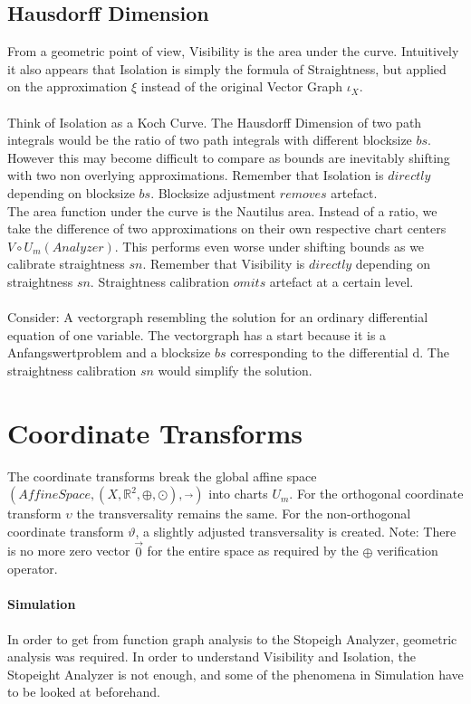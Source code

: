 \documentclass{report}
\begin{document}
\section{Hausdorff Dimension}

From a geometric point of view, Visibility is the area under the curve. Intuitively it also appears that Isolation is simply the formula of Straightness, but applied on the approximation $\xi$ instead of the original Vector Graph $\iota_{X}$.\\\\
Think of Isolation as a Koch Curve. The Hausdorff Dimension of two path integrals would be the ratio of two path integrals with different blocksize $bs$. However this may become difficult to compare as bounds are inevitably shifting with two non overlying approximations. Remember that Isolation is $directly$ depending on blocksize $bs$. Blocksize adjustment $removes$ artefact.\\
The area function under the curve is the Nautilus area. Instead of a ratio, we take the difference of two approximations on their own respective chart centers $V\circ U_{m}(Analyzer)$. This performs even worse under shifting bounds as we calibrate straightness $sn$. Remember that Visibility is $directly$ depending on straightness $sn$. Straightness calibration $omits$ artefact at a certain level.\\\\
Consider: A vectorgraph resembling the solution for an ordinary differential equation of one variable. The vectorgraph has a start because it is a Anfangswertproblem and a blocksize $bs$ corresponding to the differential $\mathrm{d}$. The straightness calibration $sn$ would simplify the solution.

\chapter{Coordinate Transforms}
The coordinate transforms break the global affine space $(AffineSpace,(X,\mathbb{R}^2,\oplus,\odot),\overrightarrow{\text{ }})$ into charts $U_{m}$. For the orthogonal coordinate transform $\upsilon$ the transversality remains the same. For the non-orthogonal coordinate transform $\vartheta$, a slightly adjusted transversality is created.
Note: There is no more zero vector $\overrightarrow{0}$ for the entire space as required by the $\oplus$ verification operator.

\subsubsection*{Simulation}
In order to get from function graph analysis to the Stopeigh Analyzer, geometric analysis was required. In order to understand Visibility and Isolation, the Stopeight Analyzer is not enough, and some of the phenomena in Simulation have to be looked at beforehand.
\end{document}
